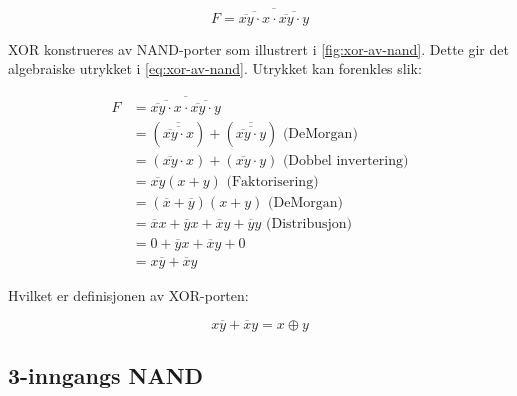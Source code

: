 \documentclass[11pt,a4paper,twocolumn]{article}
\begin{document}
\begin{equation}
\label{eq:xor-av-nand}
F = \overline{\overline{\overline{xy} \cdot x} \cdot \overline{\overline{xy} \cdot y} }
\end{equation}

\bigskip
\bigskip
\bigskip
\bigskip
\bigskip
\bigskip
\bigskip
\bigskip
\bigskip
\bigskip
\bigskip
\bigskip
\bigskip
\bigskip
\bigskip

XOR konstrueres av NAND-porter som illustrert i \cref{fig:xor-av-nand}. Dette gir det algebraiske utrykket i \cref{eq:xor-av-nand}. Utrykket kan forenkles slik:

$$
\begin{aligned}
F &= \overline{\overline{\overline{xy} \cdot x} \cdot \overline{\overline{xy} \cdot y} } \\
&= (\overline{\overline{\overline{xy} \cdot x}}) + (\overline{\overline{\overline{xy} \cdot y}}) \text{ (DeMorgan)} \\
&= (\overline{xy} \cdot x) + (\overline{xy} \cdot y) \text{ (Dobbel invertering)} \\
&= \overline{xy}(x + y) \text{ (Faktorisering)} \\
&= (\overline{x} + \overline{y})(x + y) \text{ (DeMorgan)} \\
&= \overline{x}x + \overline{y}x + \overline{x}y + \overline{y}y \text{ (Distribusjon)} \\
&= 0 + \overline{y}x + \overline{x}y + 0 \\
&= x\overline{y} + \overline{x}y
\end{aligned}
$$

Hvilket er definisjonen av XOR-porten:

$$
x\overline{y} + \overline{x}y = x \oplus y
$$

\subsection{3-inngangs NAND}
\end{document}
